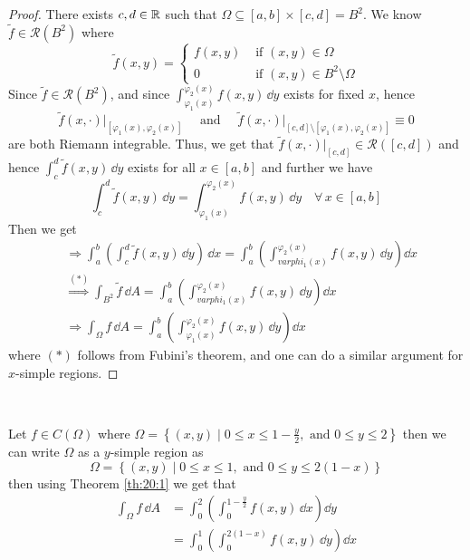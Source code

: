 \documentclass[../Analysis-3.tex]{subfiles}
\begin{document}
\begin{proof}
  There exists $c,d \in \mathbb{R}$ such that $\Omega \subseteq [a,b] \times [c,d] = B^2$. We know $\tilde{f} \in \mathscr{R}(B^2)$ where
  \[
    \tilde{f}(x,y) = \begin{cases}
      f(x,y) & \mbox{ if } (x,y) \in \Omega               \\
      0      & \mbox{ if } (x,y) \in B^2 \setminus \Omega
    \end{cases}
  \]
  Since $\tilde{f} \in \mathscr{R}(B^2)$, and since $\displaystyle{\int_{\varphi_1(x)}^{\varphi_2(x)} f(x,y) \, \dd y}$ exists for fixed $x$, hence
  \[
    \tilde{f}(x,\cdot)\big\vert_{[\varphi_1(x),\varphi_2(x)]} \quad \mbox{ and } \quad \tilde{f}(x,\cdot)\big\vert_{[c,d]\setminus[\varphi_1(x),\varphi_2(x)]} \equiv 0
  \]
  are both Riemann integrable. Thus, we get that $\tilde{f}(x,\cdot)\vert_{[c,d]} \in \mathscr{R}([c,d])$ and hence $\displaystyle{\int_c^d \tilde{f}(x,y) \, \dd y}$ exists for all $x \in [a,b]$ and further we have
  \[
    \int_c^d \tilde{f}(x,y) \, \dd y = \int_{\varphi_1(x)}^{\varphi_2(x)} f(x,y) \, \dd y \quad \forall \, x \in [a,b]
  \]
  Then we get
  \begin{align*}
     & \Longrightarrow \int_a^b \left( \int_c^d \tilde{f}(x,y) \, \dd y\right)\, \dd x = \int_a^b \left( \int_{varphi_1(x)}^{\varphi_2(x)} f(x,y) \, \dd y\right) \dd x \\
     & \overset{(*)}{\Longrightarrow} \int_{B^2} \tilde{f} \, \dd A = \int_a^b \left( \int_{varphi_1(x)}^{\varphi_2(x)} f(x,y) \, \dd y\right) \dd x                    \\
     & \Longrightarrow \int_{\Omega} f \, \dd A = \int_a^b \left( \int_{\varphi_1(x)}^{\varphi_2(x)} f(x,y) \, \dd y\right) \dd x
  \end{align*}
  where $(*)$ follows from Fubini's theorem, and one can do a similar argument for $x$-simple regions.
\end{proof}

\

\begin{Eg}{}{}
  Let $f \in C(\Omega)$ where $\Omega = \left\{ (x,y) \mid 0 \leq x \leq 1 - \frac{y}{2}, \mbox{ and } 0 \leq y \leq 2 \right\}$ then we can write $\Omega$ as a $y$-simple region as
  \[
    \Omega = \left\{ (x,y) \mid 0 \leq x \leq 1, \mbox{ and } 0 \leq y \leq 2(1-x) \right\}
  \]
  then using Theorem \ref{th:20:1} we get that
  \begin{align*}
    \int_{\Omega} f \, \dd A & = \int_0^2 \left( \int_0^{1-\frac{y}{2}} f(x,y) \, \dd x\right) \dd y \\
                             & = \int_0^1 \left( \int_0^{2(1-x)} f(x,y) \, \dd y\right) \dd x
  \end{align*}
\end{Eg}
\end{document}
